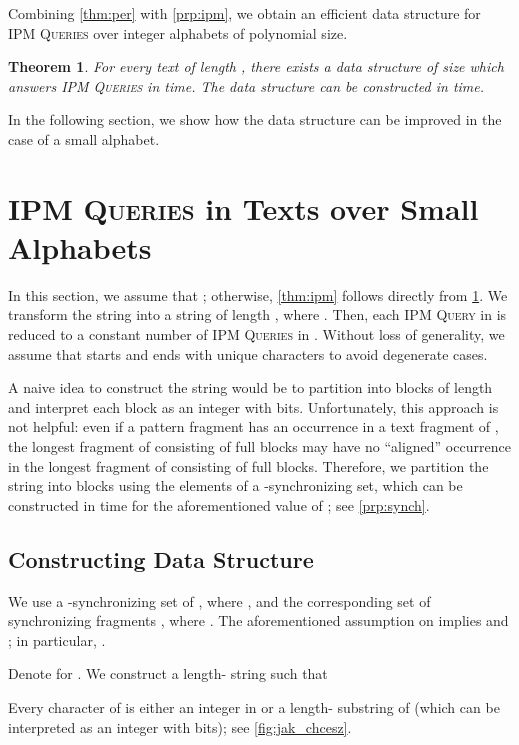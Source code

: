 \documentclass[a4paper]{article}
\newtheorem{theorem}{Theorem}[section]
\theoremstyle{definition}
\theoremstyle{remark}
\newcommand{\IPM}{\textsc{IPM Queries}\xspace}
\newcommand{\IPMOne}{\textsc{IPM Query}\xspace}
\begin{document}
Combining \cref{thm:per} with \cref{prp:ipm}, we obtain an efficient data structure for \IPM over integer alphabets of polynomial size.
\begin{theorem}\label{thm:ipm0}
  For every text  of length , there exists a data structure of size  which answers \IPM in  time.
  The data structure can be constructed in  time.
\end{theorem}

In the following section, we show how the data structure can be improved in the case of a small alphabet.

\section{\IPM in Texts over Small Alphabets}\label{sec:packed}
In this section, we assume that ; otherwise, \cref{thm:ipm} follows directly from \cref{thm:ipm0}.
We transform the string  into a string  of length , where .
Then, each \IPMOne in  is reduced to a constant number of \IPM in .
Without loss of generality, we assume that  starts and ends with unique characters to avoid degenerate cases.

A naive idea to construct the string  would be to partition  into blocks of length  and interpret each block as an integer with  bits.
Unfortunately, this approach is not helpful: even if a pattern fragment  has an occurrence in a text fragment  of ,
the longest fragment of  consisting of full blocks may have no ``aligned'' occurrence in the longest fragment of  consisting of full blocks.
Therefore, we partition the string into blocks using the elements of a -synchronizing set, which can be constructed in  time for the aforementioned value of ; see \cref{prp:synch}.

\subsection{Constructing Data Structure}
We use a -synchronizing set 
 of , where , and the corresponding set of synchronizing fragments , where
. 
The aforementioned assumption on  implies  and ; in particular, .

Denote  for .
We construct a length- string  such that 

Every character of  is either an integer in  or a length- substring of  (which can be interpreted as an integer with  bits); see \cref{fig:jak_chcesz}.
\end{document}
